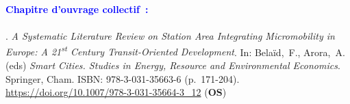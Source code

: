 \begin{refsegment}
     \newpage
     
    \begin{tcolorbox}[colback=white!5!white,
                      colframe=blue!75!blue,
                      title=Valorisation scientifique
                      \\
                      Chapitre~2]
\Large{\textbf{\textcolor{blue}{Chapitre d'ouvrage collectif~:}}}
    \\\\
\small{\textcolor{blue}{\textcite{moinse_systematic_2023}}. \foreignlanguage{english}{\textsl{A Systematic Literature Review on Station Area Integrating Micromobility in Europe: A 21\textsuperscript{st} Century Transit-Oriented Development}}. In: Belaïd,~F., Arora,~A. (eds) \textsl{Smart Cities. Studies in Energy, Resource and Environmental Economics}. Springer, Cham. ISBN: 978-3-031-35663-6 (p.~171-204).
\\
\footnotesize{\url{https://doi.org/10.1007/978-3-031-35664-3_12}} (\textbf{OS})}
    \end{tcolorbox}

    \newpage
    \begingroup
    \renewcommand{\bibfont}{\scriptsize}
\printbibliography[segment=\therefsegment, heading=subbibintoc, title={Sous-bibliographie du chapitre~2}, label=chap2:bibliographie]
    \endgroup
    \end{refsegment}